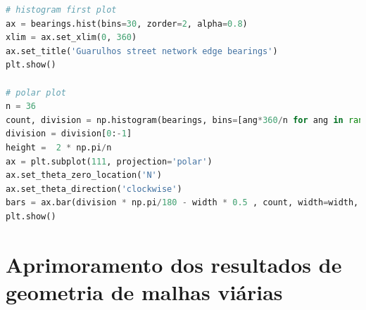 \begin{lstlisting}[language=Python, label={lst:bearings3}, caption= \small Gerando histogramas linear e polar \normalsize]
# histogram first plot
ax = bearings.hist(bins=30, zorder=2, alpha=0.8)
xlim = ax.set_xlim(0, 360)
ax.set_title('Guarulhos street network edge bearings')
plt.show()

# polar plot
n = 36
count, division = np.histogram(bearings, bins=[ang*360/n for ang in range(0,n+1)])
division = division[0:-1]
height =  2 * np.pi/n
ax = plt.subplot(111, projection='polar')
ax.set_theta_zero_location('N')
ax.set_theta_direction('clockwise')
bars = ax.bar(division * np.pi/180 - width * 0.5 , count, width=width, bottom=0.0)
plt.show()
\end{lstlisting}


\section{Aprimoramento dos resultados de geometria de malhas viárias}


